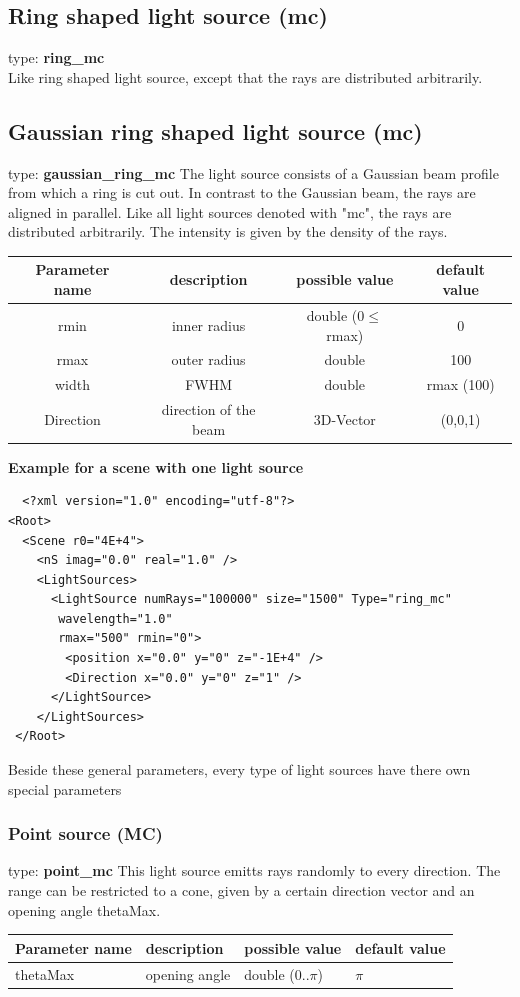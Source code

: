 \documentclass[a4paper,html,11pt,openany]{book}
\begin{document}
\subsection{Ring shaped light source (mc)}
 type: \textbf{ring\_mc} \\
Like ring shaped light source, except that the rays are distributed arbitrarily. 
 \subsection{Gaussian ring shaped light source (mc)}
type: \textbf{gaussian\_ring\_mc}
The light source consists of a Gaussian beam profile from which a ring is cut out. In contrast to the Gaussian beam, the rays are aligned in parallel.
Like all light sources denoted with "mc", the rays are distributed arbitrarily. The intensity is given by the density of the rays. 

\vspace{1em}
 \begin{tabular}{c|c|c|c}
 Parameter name & description  & possible value & default value\\
 \hline
 rmin  & inner radius & double ($0\le$ rmax) & 0 \\
 \hline 
 rmax & outer radius & double & 100 \\
 \hline 
 width & FWHM & double & rmax (100) \\
 \hline
 Direction & direction of the beam & 3D-Vector & (0,0,1) \\ 
\end{tabular}
 
\vspace{1em} 
 \textbf{Example for a scene with one light source}
 \lstset{language=XML}
 \begin{lstlisting}
  <?xml version="1.0" encoding="utf-8"?>
<Root>
  <Scene r0="4E+4">
    <nS imag="0.0" real="1.0" />
    <LightSources>
      <LightSource numRays="100000" size="1500" Type="ring_mc"
       wavelength="1.0"
       rmax="500" rmin="0">
        <position x="0.0" y="0" z="-1E+4" />
        <Direction x="0.0" y="0" z="1" />
      </LightSource>
    </LightSources>
 </Root>
 \end{lstlisting}
 Beside these general parameters, every type of light sources have there own special parameters
\subsubsection{Point source (MC)}
type: \textbf{point\_mc} \newline
This light source emitts rays randomly to every direction. The range can be restricted to a cone, given by a certain direction vector and an opening angle thetaMax. 
 \begin{longtable}{p{2cm}|m{3.5cm}|m{3.0cm}|p{1.7cm}}
Parameter name & description  & possible value & default value\\
 \hline
 thetaMax & opening angle & double (0..$\pi$) & $\pi$  
 \end{longtable}
\end{document}
